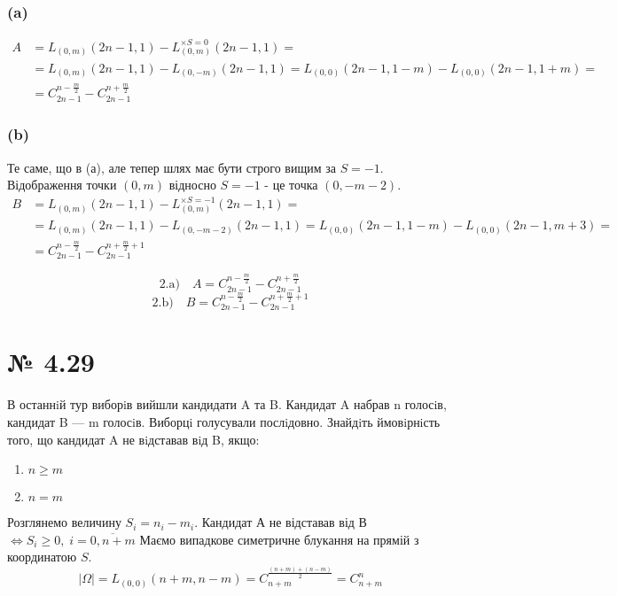 \subsubsection*{(a)}
\begin{align*}
A &= L_{(0,m)}(2n-1,1) - L^{\times S=0}_{(0,m)}(2n-1,1) = \\
&= L_{(0,m)}(2n-1,1) - L_{(0,-m)}(2n-1,1)
= L_{(0,0)}(2n-1,1-m) - L_{(0,0)}(2n-1,1+m) = \\
&= C_{2n-1}^{n-\frac{m}{2}} - C_{2n-1}^{n+\frac{m}{2}}
\end{align*}

\subsubsection*{(b)}
Те саме, що в (а), але тепер шлях має бути строго вищим за $S=-1$.
Відображення точки $(0,m)$ відносно $S=-1$ - це точка $(0,-m-2)$.
\begin{align*}
	B &= L_{(0,m)}(2n-1,1) - L^{\times S=-1}_{(0,m)}(2n-1,1) = \\
	&= L_{(0,m)}(2n-1,1) - L_{(0,-m-2)}(2n-1,1)
	= L_{(0,0)}(2n-1,1-m) - L_{(0,0)}(2n-1,m+3) = \\
	&= C_{2n-1}^{n-\frac{m}{2}} - C_{2n-1}^{n+\frac{m}{2}+1}
\end{align*}

\begin{mdframed}[style=ans]
	$$\text{2.a)}\quad A = C_{2n-1}^{n-\frac{m}{2}} - C_{2n-1}^{n+\frac{m}{2}}$$
	$$\text{2.b)}\quad B = C_{2n-1}^{n-\frac{m}{2}} - C_{2n-1}^{n+\frac{m}{2}+1}$$
\end{mdframed}

\section*{№ 4.29}
\begin{mdframed}
	В останнiй тур виборiв вийшли кандидати A та B. Кандидат A набрав n голосiв,
	кандидат B — m голосiв. Виборцi голусували послiдовно. Знайдiть ймовiрнiсть
	того, що кандидат A не вiдставав вiд B, якщо:
	\begin{enumerate}
		\item $n\ge m$
		\item $n = m$
	\end{enumerate}
\end{mdframed}

Розглянемо величину $S_i = n_i-m_i$.
Кандидат А не відставав від В $\iff S_i \ge 0 ,\; i = \overline{0,n+m}$
Маємо випадкове симетричне блукання на прямій з координатою $S$.
$$|\Omega| = L_{(0,0)}(n+m,n-m) = C_{n+m}^{\frac{(n+m) + (n-m)}{2}} = C_{n+m}^n$$

